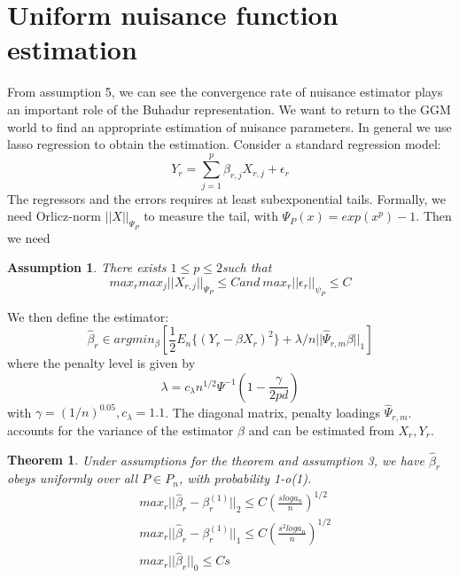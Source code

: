 \documentclass{article}
\newtheorem{theorem}{Theorem}[section]
\newtheorem{assumption}{Assumption}
\begin{document}
\section{Uniform nuisance function estimation}
From assumption 5, we can see the convergence rate of nuisance estimator plays an important role of the Buhadur representation. We want to return to the GGM world to find an appropriate estimation of nuisance parameters. In general we use lasso regression to obtain the estimation. Consider a standard regression model:
 \begin{equation}
     Y_r=\sum_{j=1}^{p}\beta_{r,j}X_{r,j}+\epsilon_r
 \end{equation}
 The regressors and the errors requires at least subexponential tails. Formally, we need Orlicz-norm $||X||_{\Psi_P}$ to measure the tail, with $\Psi_P(x)=exp(x^p)-1$. Then we need 
 \begin{assumption}
     There exists $1\leq p\leq 2$such that
     \begin{equation}
         max_{r} max_{j} ||X_{r,j}||_{\Psi_P}\leq C and\ max_{r}||\epsilon_r||_{\psi_P}\leq C
     \end{equation}
 \end{assumption}

 We then define the estimator:
\begin{equation}
    \hat{\beta}_r \in argmin_\beta [\frac{1}{2}E_n \{ (Y_r-\beta X_r)^2\}+\lambda/n ||\hat{\Psi}_{r,m}\beta||_1]
\end{equation}
where the penalty level is given by
\begin{equation}
    \lambda=c_\lambda n^{1/2}\Psi^{-1}(1-\frac{\gamma}{2pd})
\end{equation}
with $\gamma=(1/n)^{0.05}, c_\lambda=1.1$. The diagonal matrix, penalty loadings $\hat{\Psi}_{r,m}$. accounts for the variance of the estimator $\beta$ and can be estimated from $X_r,Y_r$. 

\begin{theorem}
    Under assumptions for the theorem and assumption 3, we have $\hat{\beta}_r$ obeys uniformly over all $P\in P_n$,
    with probability 1-o(1).
    \begin{equation}
        \begin{split}
            &max_{r}||\hat{\beta}_r-\beta_r^{(1)}||_2\leq C(\frac{slog a_n}{n})^{1/2}\\
            &max_{r}||\hat{\beta}_r-\beta_r^{(1)}||_1\leq C(\frac{s^2log a_n}{n})^{1/2}\\
            &max_{r}||\hat{\beta}_r||_0\leq Cs
        \end{split}
    \end{equation}
\end{theorem}
\end{document}
